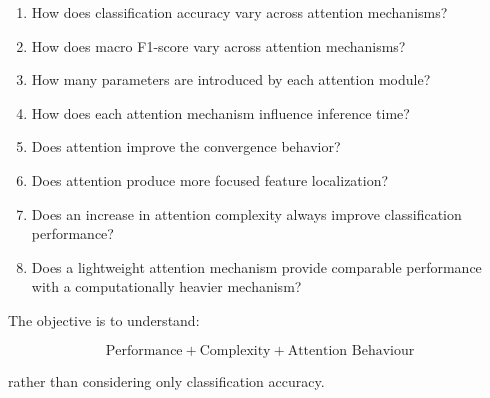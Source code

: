 \documentclass[10pt]{article}
\begin{document}
\begin{enumerate}

\item How does classification accuracy vary across attention mechanisms?

\item How does macro F1-score vary across attention mechanisms?

\item How many parameters are introduced by each attention module?

\item How does each attention mechanism influence inference time?

\item Does attention improve the convergence behavior?

\item Does attention produce more focused feature localization?

\item Does an increase in attention complexity always improve classification
performance?

\item Does a lightweight attention mechanism provide comparable performance
with a computationally heavier mechanism?

\end{enumerate}

The objective is to understand:

\[
\boxed{
\text{Performance}
+
\text{Complexity}
+
\text{Attention Behaviour}
}
\]

rather than considering only classification accuracy.
\end{document}
